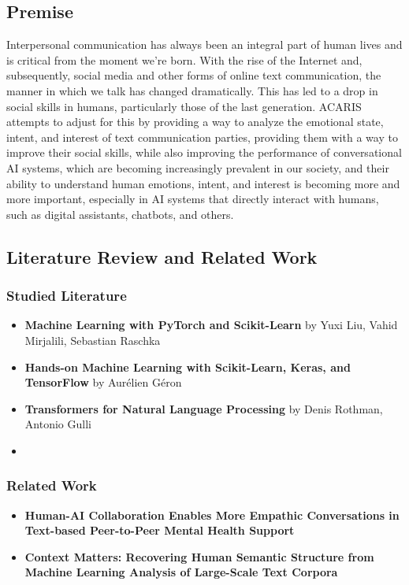 \documentclass{article}
\begin{document}
\subsection{Premise}
Interpersonal communication has always been an integral part of human lives and is critical from the moment we're born. With the rise of the Internet and, subsequently, social media and other forms of online text communication, the manner in which we talk has changed dramatically. This has led to a drop in social skills in humans, particularly those of the last generation. ACARIS attempts to adjust for this by providing a way to analyze the emotional state, intent, and interest of text communication parties, providing them with a way to improve their social skills, while also improving the performance of conversational AI systems, which are becoming increasingly prevalent in our society, and their ability to understand human emotions, intent, and interest is becoming more and more important, especially in AI systems that directly interact with humans, such as digital assistants, chatbots, and others.

\subsection{Literature Review and Related Work}
\subsubsection{Studied Literature}
\begin{itemize}
	\item \textbf{Machine Learning with PyTorch and Scikit-Learn}\cite{raschka2022machine} by Yuxi Liu, Vahid Mirjalili, Sebastian Raschka
	\item \textbf{Hands-on Machine Learning with Scikit-Learn, Keras, and TensorFlow}\cite{geron2022hands} by Aurélien Géron
	\item \textbf{Transformers for Natural Language Processing}\cite{rothman2022transformers} by Denis Rothman, Antonio Gulli
	\item 
\end{itemize}
\subsubsection{Related Work}
\begin{itemize}
	\item \textbf{Human-AI Collaboration Enables More Empathic Conversations in Text-based Peer-to-Peer Mental Health Support}\cite{sharma2022humanai}
	\item \textbf{Context Matters: Recovering Human Semantic Structure from Machine Learning Analysis of Large-Scale Text Corpora}\cite{https://doi.org/10.1111/cogs.13085}
\end{itemize}
\end{document}
